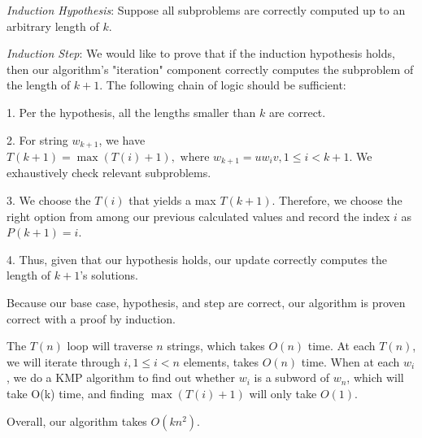 \textit{Induction Hypothesis}: Suppose all subproblems are correctly computed up to an arbitrary length of $k$.

\textit{Induction Step}: We would like to prove that if the induction hypothesis holds, then our algorithm's "iteration" component correctly computes the subproblem of the length of $k+1$. The following chain of logic should be sufficient:

1. Per the hypothesis, all the lengths smaller than $k$ are correct.

2. For string $w_{k+1}$, we have $T(k+1) = \max(T(i) + 1), \text{ where }w_{k+1}=u w_{i} v, 1 \leq i < k+1$. We exhaustively check relevant subproblems.

3. We choose the $T(i)$ that yields a max $T(k+1)$. Therefore, we choose the right option from among our previous calculated values and record the index $i$ as $P(k+1)=i$.

4. Thus, given that our hypothesis holds, our update correctly computes the length of $k+1$'s solutions.

Because our base case, hypothesis, and step are correct, our algorithm is proven correct with a proof by induction.



The $T(n)$ loop will traverse $n$ strings, which takes $O(n)$ time. At each $T(n)$, we will iterate through $i, 1
\leq i < n$ elements, takes $O(n)$ time. When at each $w_i$, we do a KMP algorithm to find out whether $w_i$ is a subword of $w_n$, which will take O(k) time, and finding $\max(T(i) + 1)$ will only take $O(1)$.

Overall, our algorithm takes $O(kn^2)$.



